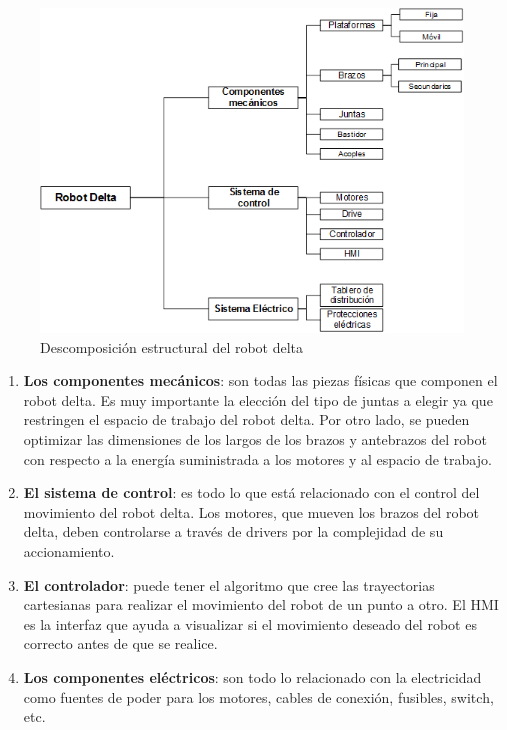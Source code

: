     \begin{figure}[h]
        \centering
        \includegraphics[width=0.85\linewidth]{Main/Chapter3/Images3/3-2/esquema-categorias-estructura.png}
        \caption{Descomposición estructural del robot delta \cite{Robot_parelelo_tipo}}
        \label{f:Cap3-2_esquema_arquitectura_robot_delta}
    \end{figure}
    
    \begin{enumerate}
        \item{ \textbf{Los componentes mecánicos}: son todas las piezas físicas que componen el robot delta. Es muy importante la elección del tipo de juntas a elegir ya que restringen el espacio de trabajo del robot delta. Por otro lado, se pueden optimizar las dimensiones de los largos de los brazos y antebrazos del robot con respecto a la energía suministrada a los motores y al espacio de trabajo.}
        \item{\textbf{El sistema de control}: es todo lo que está relacionado con el control del movimiento del robot delta. Los motores, que mueven los brazos del robot delta, deben controlarse a través de drivers por la complejidad de su accionamiento.}
        \item{ \textbf{El controlador}: puede tener el algoritmo que cree las trayectorias cartesianas para realizar el movimiento del robot de un punto a otro. El HMI es la interfaz que ayuda a visualizar si el movimiento deseado del robot es correcto antes de que se realice.}
        \item{   \textbf{Los componentes eléctricos}: son todo lo relacionado con la electricidad como fuentes de poder para los motores, cables de conexión, fusibles, switch, etc.}
    \end{enumerate}

